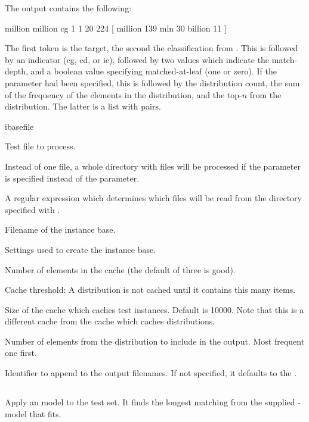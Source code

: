 \documentclass[a4paper,10pt,twoside]{report}
\begin{document}
The output contains the following:

\begin{wout}{}
million million cg 1 1 20 224 [ million 139 mln 30 billion 11 ]
\end{wout}

The first token is the target, the second the classification from
\Timbl{}. This is followed by an indicator (cg, cd, or ic), followed
by two values which indicate the match-depth, and a boolean value
specifying matched-at-leaf (one or zero). If the  parameter
had been specified, this is followed by the distribution count, the
sum of the frequency of the elements in the distribution, and the
top-$n$ from the distribution. The latter is a list with
 pairs.

\begin{varlist}{ibasefile}
\item[filename] Test file to process.
\item[dir] Instead of one file, a whole directory with files will be
  processed if the  parameter is specified instead of the
   parameter.
\item[dirmatch] A regular expression which determines which files will
  be read from the directory specified with .
\item[ibasefile] Filename of the instance base.
\item[timbl] Settings used to create the instance base.
\item[cache] Number of elements in the cache (the default of three is
  good). 
\item[cth] Cache threshold: A distribution is not cached until it
  contains this many items.
\item[cs] Size of the cache which caches test instances. Default is
  \num{10000}. Note that this is a different cache from the cache which
  caches distributions. 
\item[topn] Number of elements from the \Timbl{} distribution to
  include in the output. Most frequent one first.
\item[id] Identifier to append to the output filenames. If not
  specified, it defaults to the \pid{}.
\end{varlist}

\subsection{}

Apply an \ngram{} model to the test set. It finds the longest matching
\ngram{} from the supplied \ngram{}-model that fits.
\end{document}
